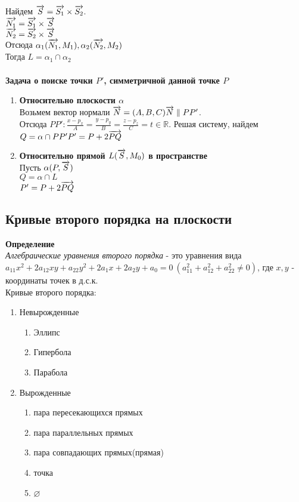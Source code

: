 \documentclass[12pt]{article}
\begin{document}
Найдем $\overrightarrow{S} = \overrightarrow{S_1}\times \overrightarrow{S_2}$.\\
$\overrightarrow{N_1} = \overrightarrow{S_1}\times\overrightarrow{S}$\\
$\overrightarrow{N_2} = \overrightarrow{S_2}\times\overrightarrow{S}$\\
Отсюда $\alpha_1(\overrightarrow{N_1},M_1), \alpha_2(\overrightarrow{N_2},M_2)$\\
Тогда $L = \alpha_1 \cap \alpha_2$\\\\
\textbf{Задача о поиске точки $P'$, симметричной данной точке $P$}
\begin{enumerate}
    \item \textbf{Относительно плоскости $\alpha$}\\
    Возьмем вектор нормали $\overrightarrow{N} = (A,B,C)\\\overrightarrow{N} \parallel PP'$.\\
    Отсюда $PP': \frac{x-p_x}A=\frac{y-p_y}B=\frac{z-p_z}C=t\in\mathbb{R}$. Решая систему, найдем $Q = \alpha \cap PP'\\
    P' = P + 2\overrightarrow{PQ}$
    \item \textbf{Относительно прямой $L(\overrightarrow{S},M_0)$ в пространстве}\\
    Пусть $\alpha(P, \overrightarrow{S})$\\
    $Q = \alpha \cap L$\\
    $P' = P + 2\overrightarrow{PQ}$
\end{enumerate}
\subsection{Кривые второго порядка на плоскости}
\textbf{Определение}\\
\textit{Алгебраические уравнения второго порядка} - это уравнения вида\\ $a_{11}x^2+2a_{12}xy+a_{22}y^2+2a_1x+2a_2y+a_0=0\ (a_{11}^2+a_{12}^2+a_{22}^2 \neq 0)$, где $x,y$ - координаты точек в д.с.к.\\
Кривые второго порядка: \begin{enumerate}
    \item Невырожденные
    \begin{enumerate}
        \item Эллипс
        \item Гипербола
        \item Парабола
    \end{enumerate}
    \item Вырожденные
    \begin{enumerate}
        \item пара пересекающихся прямых
        \item пара параллельных прямых
        \item пара совпадающих прямых(прямая)
        \item точка
        \item $\varnothing$
    \end{enumerate}
\end{enumerate}
\end{document}
